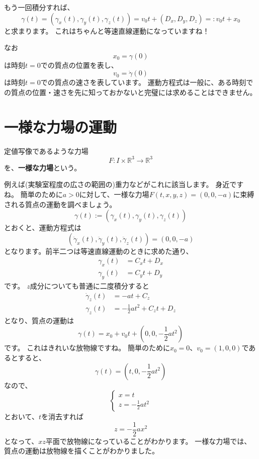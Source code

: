もう一回積分すれば、
\[
  \gamma(t)=(\gamma_x(t),\gamma_y(t),\gamma_z(t))=v_0t+(D_x,D_y,D_z)=:v_0t+x_0
\]
と求まります。
これはちゃんと等速直線運動になっていますね！

なお
\[
  x_0=\gamma(0)
\]
は時刻$t=0$での質点の位置を表し、
\[
  v_0=\dot\gamma(0)
\]
は時刻$t=0$での質点の速さを表しています。
運動方程式は一般に、ある時刻での質点の位置・速さを先に知っておかないと完璧には求めることはできません。



\section{一様な力場の運動}

\begin{definition}
  定値写像であるような力場
  \[
    F:I\times\mathbb{R}^3\to\mathbb{R}^3
  \]
  を、\textbf{一様な力場}という。
\end{definition}

例えば(実験室程度の広さの範囲の)重力などがこれに該当します。
身近ですね。
簡単のために$a>0$に対して、一様な力場$F(t,x,y,z)=(0,0,-a)$に束縛される質点の運動を調べましょう。
\[
  \gamma(t):=(\gamma_x(t),\gamma_y(t),\gamma_z(t))
\]
とおくと、運動方程式は
\[
  (\ddot\gamma_x(t),\ddot\gamma_y(t),\ddot\gamma_z(t))=(0,0,-a)
\]
となります。前半二つは等速直線運動のときに求めた通り、
\begin{align*}
  \gamma_x(t)&=C_xt+D_x\\
  \gamma_y(t)&=C_yt+D_y
\end{align*}
です。
$z$成分についても普通に二度積分すると
\begin{align*}
  \dot\gamma_z(t)&=-at+C_z\\
  \gamma_z(t)&=-\frac12at^2+C_zt+D_z
\end{align*}
となり、質点の運動は
\[
  \gamma(t)=x_0+v_0t+\left(0,0,-\frac12at^2\right)
\]
です。
これはきれいな放物線ですね。
簡単のために$x_0=0$、$v_0=(1,0,0)$であるとすると、
\[
  \gamma(t)=\left(t,0,-\frac12at^2\right)
\]
なので、
\[
  \begin{cases}
    x=t\\
    z=-\frac12at^2
  \end{cases}
\]
とおいて、$t$を消去すれば
\[
  z=-\frac12ax^2
\]
となって、$xz$平面で放物線になっていることがわかります。
一様な力場では、質点の運動は放物線を描くことがわかりました。
